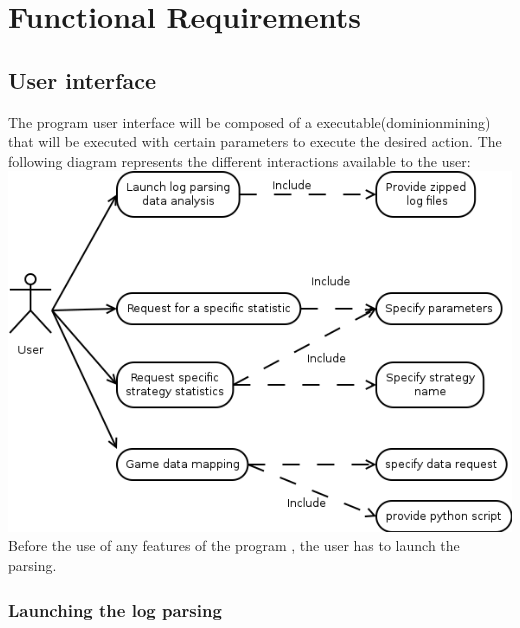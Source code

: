\documentclass{scrreprt}
\begin{document}
\chapter{Functional Requirements}
\section{User interface}
The program user interface will be composed of a executable(dominionmining) that will be
executed with certain parameters to execute the desired action.
The following diagram represents the different interactions available to the user:\\
\includegraphics[scale=0.45,keepaspectratio]{UseCaseParsing}\\
Before the use of any features of the program , the user has to launch the parsing.
\subsection{Launching the log parsing}
\end{document}
